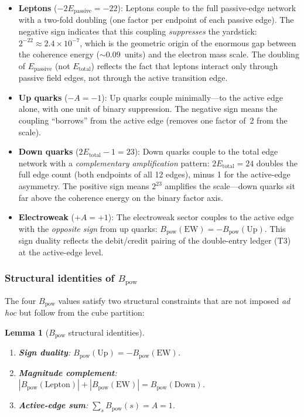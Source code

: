 \documentclass[11pt,a4paper]{article}
\newtheorem{lemma}[theorem]{Lemma}
\theoremstyle{definition}
\theoremstyle{remark}
\newcommand{\Epass}{E_{\mathrm{passive}}}
\newcommand{\Etot}{E_{\mathrm{total}}}
\begin{document}
\begin{itemize}[nosep]
  \item \textbf{Leptons} ($-2\Epass = -22$):
    Leptons couple to the full passive-edge network with a two-fold doubling
    (one factor per endpoint of each passive edge).  The negative sign
    indicates that this coupling \emph{suppresses} the yardstick:
    $2^{-22} \approx 2.4 \times 10^{-7}$, which is the geometric origin of
    the enormous gap between the coherence energy ($\sim 0.09$~units) and the
    electron mass scale.  The doubling of $\Epass$ (not $\Etot$) reflects
    the fact that leptons interact only through passive field edges, not
    through the active transition edge.

  \item \textbf{Up quarks} ($-A = -1$):
    Up quarks couple minimally---to the active edge alone, with one unit of
    binary suppression.  The negative sign means the coupling ``borrows'' from
    the active edge (removes one factor of~2 from the scale).

  \item \textbf{Down quarks} ($2\Etot - 1 = 23$):
    Down quarks couple to the total edge network with a \emph{complementary
    amplification} pattern: $2\Etot = 24$ doubles the full edge count (both
    endpoints of all 12 edges), minus 1 for the active-edge asymmetry.  The
    positive sign means $2^{23}$ amplifies the scale---down quarks sit far
    above the coherence energy on the binary factor axis.

  \item \textbf{Electroweak} ($+A = +1$):
    The electroweak sector couples to the active edge with the \emph{opposite
    sign} from up quarks: $B_{\mathrm{pow}}(\text{EW}) =
    -B_{\mathrm{pow}}(\text{Up})$.  This sign duality reflects the debit/credit
    pairing of the double-entry ledger (T3) at the active-edge level.
\end{itemize}

\subsubsection{Structural identities of $B_{\mathrm{pow}}$}

The four $B_{\mathrm{pow}}$ values satisfy two structural constraints that
are not imposed \emph{ad hoc} but follow from the cube partition:

\begin{lemma}[$B_{\mathrm{pow}}$ structural identities]
\label{lem:Bpow_identities}
\leavevmode
\begin{enumerate}[nosep,label=(B\arabic*)]
  \item \textbf{Sign duality}:
    $B_{\mathrm{pow}}(\mathrm{Up}) = -B_{\mathrm{pow}}(\mathrm{EW})$.
  \item \textbf{Magnitude complement}:
    $|B_{\mathrm{pow}}(\mathrm{Lepton})| + |B_{\mathrm{pow}}(\mathrm{EW})|
     = B_{\mathrm{pow}}(\mathrm{Down})$.
  \item \textbf{Active-edge sum}:
    $\sum_s B_{\mathrm{pow}}(s) = A = 1$.
\end{enumerate}
\end{lemma}
\end{document}
